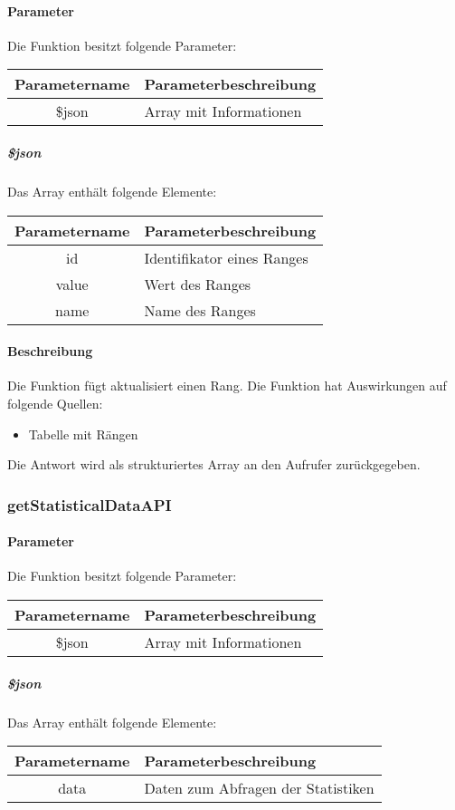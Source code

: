 \paragraph{Parameter} Die Funktion besitzt folgende Parameter:
\begin{table}[H]
	\begin{tabular}{|c|p{11cm}|}
		\hline
		\textbf{Parametername} & \textbf{Parameterbeschreibung} \\ \hline
		\$json & Array mit Informationen \\ \hline
	\end{tabular}
\end{table}
\subparagraph{\$json}Das Array enthält folgende Elemente:
\begin{table}[H]
	\begin{tabular}{|c|p{11cm}|}
		\hline
		\textbf{Parametername} & \textbf{Parameterbeschreibung} \\ \hline
		id    & Identifikator eines Ranges \\ \hline
		value & Wert des Ranges \\ \hline
		name  & Name des Ranges \\ \hline
	\end{tabular}
\end{table}
\paragraph{Beschreibung} Die Funktion fügt aktualisiert einen Rang. Die Funktion hat Auswirkungen auf folgende Quellen:
\begin{itemize}
	\item Tabelle mit Rängen
\end{itemize}
Die Antwort wird als strukturiertes Array an den Aufrufer zurückgegeben.
\subsubsection{getStatisticalDataAPI}
\paragraph{Parameter} Die Funktion besitzt folgende Parameter:
\begin{table}[H]
	\begin{tabular}{|c|p{11cm}|}
		\hline
		\textbf{Parametername} & \textbf{Parameterbeschreibung} \\ \hline
		\$json & Array mit Informationen \\ \hline
	\end{tabular}
\end{table}
\subparagraph{\$json}Das Array enthält folgende Elemente:
\begin{table}[H]
	\begin{tabular}{|c|p{11cm}|}
		\hline
		\textbf{Parametername} & \textbf{Parameterbeschreibung} \\ \hline
		data & Daten zum Abfragen der Statistiken \\ \hline
	\end{tabular}
\end{table}
